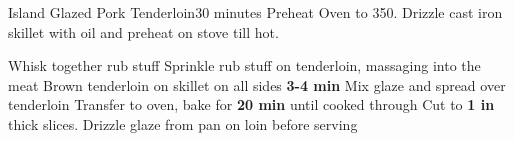 \documentclass[a6paper,landscape]{article}
\begin{document}
\begin{recipe}{Island Glazed Pork Tenderloin}{30 minutes}{}
  Preheat Oven to 350.
  Drizzle cast iron skillet with oil and preheat on stove till hot.
  
  Whisk together rub stuff
  Sprinkle rub stuff on tenderloin, massaging into the meat
  \newstep Brown tenderloin on skillet on all sides \textbf{3-4 min}
  Mix glaze and spread over tenderloin
  \newstep Transfer to oven, bake for \textbf{20 min} until cooked through
  \newstep Cut to \textbf{1 in} thick slices. Drizzle glaze from pan on loin before serving

  \end{recipe}
\end{document}
